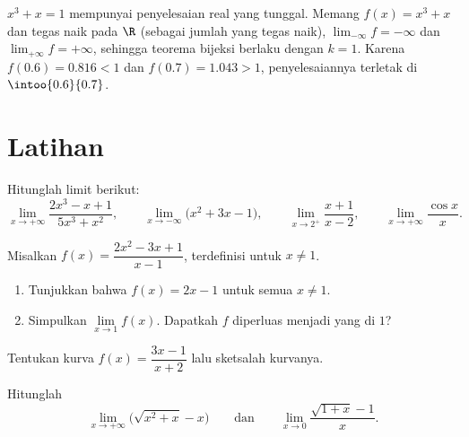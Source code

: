 \begin{example}\label{ex:g12:limcont:cubic}
 $x^3 + x = 1$ mempunyai penyelesaian real yang tunggal. Memang
$f(x) = x^3 + x$  dan tegas naik pada $\R$ (sebagai jumlah
 yang tegas naik), $\lim_{-\infty} f = -\infty$ dan
$\lim_{+\infty} f = +\infty$, sehingga teorema bijeksi berlaku dengan $k = 1$.
Karena $f(0.6) = 0.816 < 1$ dan $f(0.7) = 1.043 > 1$, penyelesaiannya terletak
di $\intoo{0.6}{0.7}$.
\end{example}

\section{Latihan}

\begin{exercise}[$\star$]\label{exo:g12:limcont:1}
Hitunglah limit berikut:
\[
\lim_{x\to+\infty} \frac{2x^3 - x + 1}{5x^3 + x^2}, \qquad
\lim_{x\to-\infty} \bigl(x^2 + 3x - 1\bigr), \qquad
\lim_{x\to 2^+} \frac{x+1}{x-2}, \qquad
\lim_{x\to+\infty} \frac{\cos x}{x}.
\]
\end{exercise}

\begin{exercise}[$\star$]\label{exo:g12:limcont:2}
Misalkan $f(x) = \dfrac{2x^2 - 3x + 1}{x - 1}$, terdefinisi untuk $x \neq 1$.
\begin{enumerate}
  \item Tunjukkan bahwa $f(x) = 2x - 1$ untuk semua $x \neq 1$.
  \item Simpulkan $\lim\limits_{x \to 1} f(x)$. Dapatkah $f$ diperluas menjadi
         yang  di $1$?
\end{enumerate}
\end{exercise}

\begin{exercise}[$\star$]\label{exo:g12:limcont:3}
Tentukan  kurva
$f(x) = \dfrac{3x - 1}{x + 2}$ lalu sketsalah kurvanya.
\end{exercise}

\begin{exercise}[$\star\star$]\label{exo:g12:limcont:4}
Hitunglah
\[
\lim_{x\to+\infty} \bigl(\sqrt{x^2 + x} - x\bigr)
\qquad\text{dan}\qquad
\lim_{x\to 0} \frac{\sqrt{1+x} - 1}{x}.
\]
\end{exercise}

